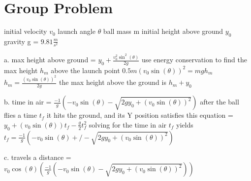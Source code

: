 \chapter{Group Problem}
\label{Group Problem}
initial velocity $v_{0}$\newline
launch angle $\theta$\newline
ball mass m\newline
initial height above ground $y_{0}$\newline
gravity g = $9.81 \frac{m}{s^{2}}$

a. max height above ground = $y_{0} + \frac{v_{0}^{2}\sin^{2}(\theta)}{2g}$\newline
use energy conservation to find the max height $h_{m}$\newline
above the launch point\newline
$0.5m(v_{0}\sin(\theta))^{2} = mgh_{m}$\newline
$h_{m} = \frac{(v_{0}\sin(\theta))^{2}}{2g}$\newline
the max height above the ground is $h_{m} + y_{0}$\newline

b. time in air = $\frac{-1}{g}(-v_{0}\sin(\theta) - \sqrt{2gy_{0} + (v_{0}\sin(\theta))^{2}})$\newline
after the ball flies a time $t_{f}$ it hits the\newline
ground, and its Y position satisfies this equation = $y_{0} + (v_{0}\sin(\theta))t_{f} - \frac{g}{2}t_{f}^{2}$\newline
solving for the time in air $t_{f}$ yields\newline
$t_{f} = \frac{-1}{g}(-v_{0}\sin(\theta) +/- \sqrt{2gy_{0} + (v_{0}\sin(\theta))^{2}})$\newline

c. travels a distance = $v_{0}\cos(\theta)(\frac{-1}{g}(-v_{0}\sin(\theta) - \sqrt{2gy_{0} + (v_{0}\sin(\theta))^{2}}))$\newline

